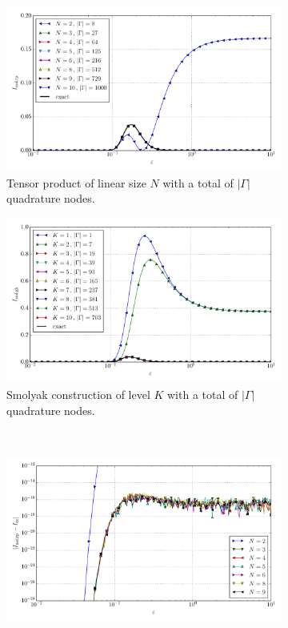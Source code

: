 \documentclass[a4paper,10pt]{article}
\begin{document}
\begin{figure}[ht!]
  \begin{subfigure}[t]{0.5\linewidth}
    \includegraphics[width=\linewidth]{./plots/tp_sg_3d_conv_eps_(4,0,0)_(0,4,0)_val_nsd_tp.pdf}
    \caption{Tensor product of linear size $N$ with a total of $|\Gamma|$ quadrature nodes.}
    \label{fig:tp_sg_3d_conv_p_400_040_val_nsd_tp}
  \end{subfigure}
  \begin{subfigure}[t]{0.5\linewidth}
    \includegraphics[width=\linewidth]{./plots/tp_sg_3d_conv_eps_(4,0,0)_(0,4,0)_val_nsd_gk.pdf}
    \caption{Smolyak construction of level $K$ with a total of $|\Gamma|$ quadrature nodes.}
    \label{fig:tp_sg_3d_conv_p_400_040_val_nsd_gk}
  \end{subfigure} \\
  \begin{subfigure}[t]{0.5\linewidth}
    \includegraphics[width=\linewidth]{./plots/tp_sg_3d_conv_eps_(4,0,0)_(0,4,0)_err_nsd_tp.pdf}

\end{subfigure}
\end{figure}
\end{document}
